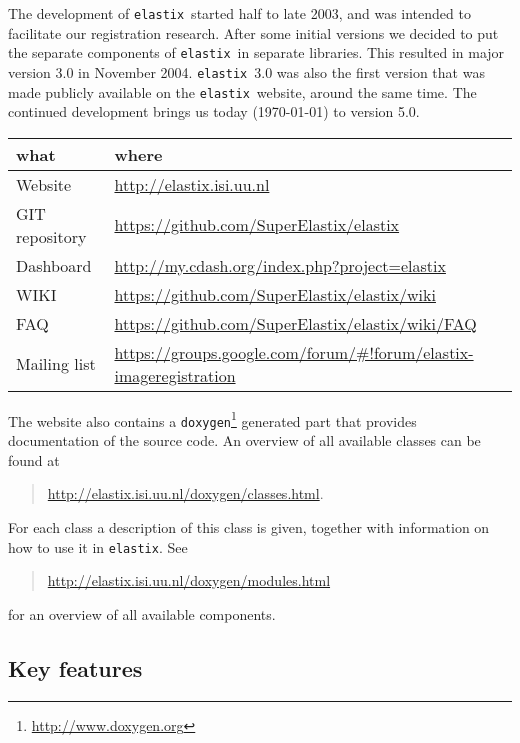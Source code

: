 \documentclass[]{report}
\newcommand{\elastix}{\texttt{elastix}}
\begin{document}
The development of \elastix\ started half to late 2003, and was
intended to facilitate our registration research. After some initial
versions we decided to put the separate components of \elastix\ in
separate libraries. This resulted in major version 3.0 in November
2004. \elastix\ 3.0 was also the first version that was made
publicly available on the \elastix\ website, around the same time.
The continued development brings us today (\today) to version 5.0.

\begin{table}[h!]
\begin{tabular}{l|l}
what & where \\
\hline
Website        & \url{http://elastix.isi.uu.nl} \\
GIT repository & \url{https://github.com/SuperElastix/elastix} \\
Dashboard      & \url{http://my.cdash.org/index.php?project=elastix} \\
WIKI           & \url{https://github.com/SuperElastix/elastix/wiki} \\
FAQ            & \url{https://github.com/SuperElastix/elastix/wiki/FAQ} \\
Mailing list   &
\url{https://groups.google.com/forum/#!forum/elastix-imageregistration}
\end{tabular}
\end{table}

The website also contains a
\texttt{doxygen}\footnote{\url{http://www.doxygen.org}} generated part that
provides documentation of the source code. An overview of all available classes
can be found at
\begin{quote}
\url{http://elastix.isi.uu.nl/doxygen/classes.html}.
\end{quote}
For each class a description of this class is given, together with
information on how to use it in \elastix. See
\begin{quote}
\url{http://elastix.isi.uu.nl/doxygen/modules.html}
\end{quote}
for an overview of all available components.

\subsection{Key features}\label{sec:elastix:key}
\end{document}
